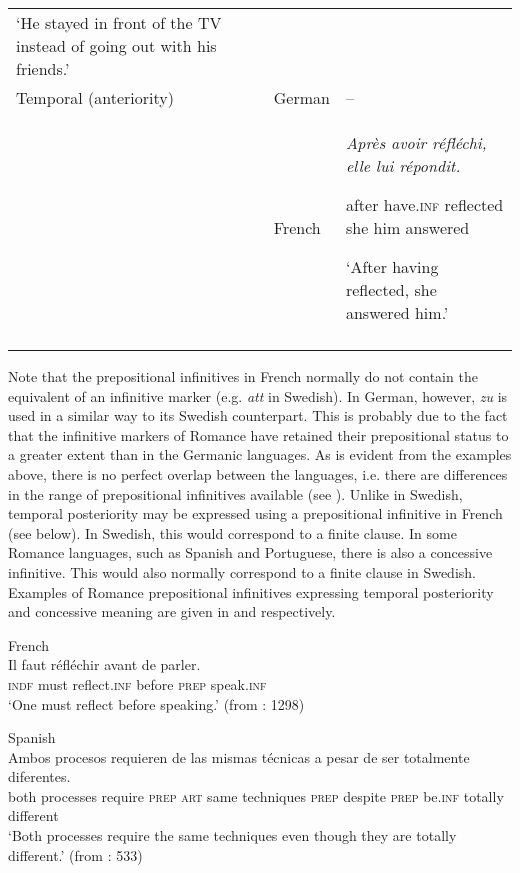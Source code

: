 \documentclass[output=paper]{langscibook}
\begin{document}
\begin{table}
\begin{tabularx}{\textwidth}{p{2cm}lQ}
‘He stayed in front of the TV instead of going out with his friends.’ \\

\tablevspace
Temporal (anteriority) & German & –\\
& French & \textit{Après   avoir     réfléchi,   elle   lui   répondit.}

after   have.\textsc{inf}   reflected   she   him   answered

‘After having reflected, she answered him.’\\

\lspbottomrule
\end{tabularx}
\end{table}


Note that the prepositional infinitives in French normally do not contain the equivalent of an infinitive marker (e.g. \textit{att} in Swedish). In German, however, \textit{zu} is used in a similar way to its Swedish counterpart. This is probably due to the fact that the infinitive markers of Romance have retained their prepositional status to a greater extent than in the Germanic languages. As is evident from the examples above, there is no perfect overlap between the languages, i.e. there are differences in the range of prepositional infinitives available (see \citealt{Hengenveld1998}). Unlike in Swedish, temporal posteriority may be expressed using a prepositional infinitive in French (see  below). In Swedish, this would correspond to a finite clause. In some Romance languages, such as Spanish and Portuguese, there is also a concessive infinitive. This would also normally correspond to a finite clause in Swedish. Examples of Romance prepositional infinitives expressing temporal posteriority and concessive meaning are given in  and  respectively. 


\ea
\label{ex:kalm:5}
\ea French\label{ex:kalm:5a}\\ 
\gll Il faut réfléchir avant de parler.\\
\textsc{indf} must reflect.\textsc{inf} before \textsc{prep} speak.\textsc{inf}\\
\glt ‘One must reflect before speaking.’ (from \citealt{Grevisse1993}: 1298) 

\ex Spanish\label{ex:kalm:5b}\\ 
\gll Ambos procesos requieren de las mismas técnicas a pesar de ser totalmente diferentes.\\
both processes require \textsc{prep} \textsc{art} same techniques \textsc{prep} despite \textsc{prep} be.\textsc{inf} totally different\\
\glt ‘Both processes require the same techniques even though they are totally different.’ (from \citealt{Schulte2007What}: 533)
\z 
\z 
\end{document}

